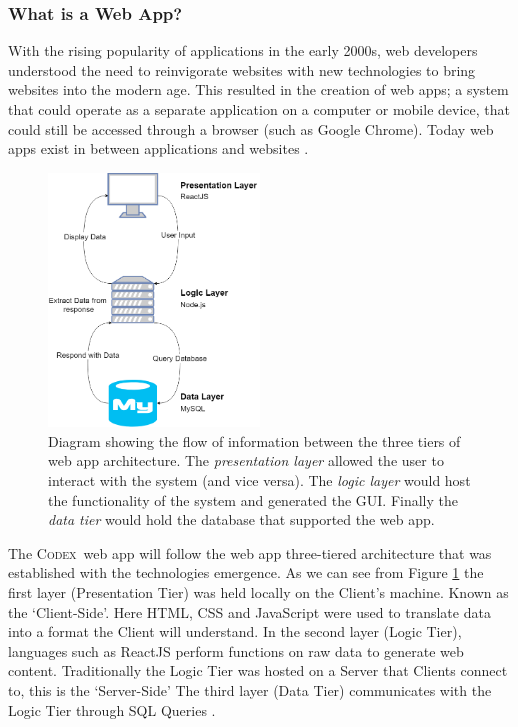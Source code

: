 \documentclass[final]{cmpreport}
\newcommand{\Codex}{\textsc{Codex}}
\begin{document}
			\subsubsection{What is a Web App?} \label{sec:what-web-app}
			With the rising popularity of applications in the early 2000s, web developers understood the need to reinvigorate websites with new technologies to bring websites into the modern age. This resulted in the creation of web apps; a system that could operate as a separate application on a computer or mobile device, that could still be accessed through a browser (such as Google Chrome). Today web apps exist in between applications and websites \citep{web-apps}. 
			
			\begin{figure}[h]
				\centering
				\includegraphics[width=0.5\textwidth]{web-app-arch.PNG}
				\caption[Three Tiered Web App Architecture]{Diagram showing the flow of information between the three tiers of web app architecture. The \emph{presentation layer} allowed the user to interact with the system (and vice versa). The \emph{logic layer} would host the functionality of the system and generated the GUI. Finally the \emph{data tier} would hold the database that supported the web app.} \label{fig:web-apps}
			\end{figure}
		
			The \Codex \ web app will follow the web app three-tiered architecture that was established with the technologies emergence. As we can see from Figure \ref{fig:web-apps} the first layer (Presentation Tier) was held locally on the Client's machine. Known as the `Client-Side'. Here HTML, CSS and JavaScript were used to translate data into a format the Client will understand. In the second layer (Logic Tier), languages such as ReactJS perform functions on raw data to generate web content. Traditionally the Logic Tier was hosted on a Server that Clients connect to, this is the `Server-Side' The third layer (Data Tier) communicates with the Logic Tier through SQL Queries \citep{SecurityWebApps}. 
			
\end{document}
